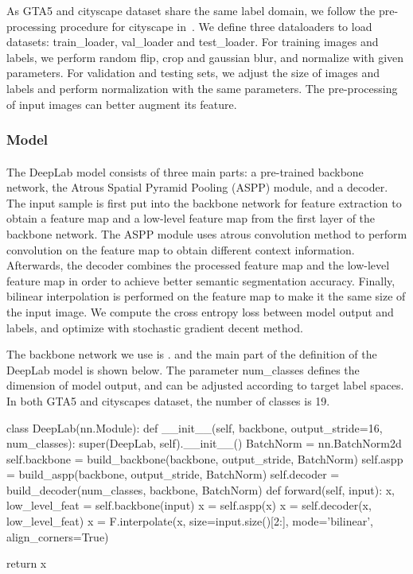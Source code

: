 As GTA5 and cityscape dataset share the same label domain, we follow the pre-processing procedure for cityscape in~\cite{Deeplab}. We define three dataloaders to load datasets: train\_loader, val\_loader and test\_loader. For training images and labels, we perform random flip, crop and gaussian blur, and normalize with given parameters. For validation and testing sets, we adjust the size of images and labels and perform normalization with the same parameters. The pre-processing of input images can better augment its feature.
\subsubsection{Model}
\paragraph{}
The DeepLab model consists of three main parts: a pre-trained backbone network, the Atrous Spatial Pyramid Pooling (ASPP) module, and a decoder. The input sample is first put into the backbone network for feature extraction to obtain a feature map and a low-level feature map from the first layer of the backbone network. The ASPP module uses atrous convolution method to perform convolution on the feature map to obtain different context information. Afterwards, the decoder combines the processed feature map and the low-level feature map in order to achieve better semantic segmentation accuracy. Finally, bilinear interpolation is performed on the feature map to make it the same size of the input image. We compute the cross entropy loss between model output and labels, and optimize with stochastic gradient decent method.

The backbone network we use is . and the main part of the definition of the  DeepLab model is shown below. The parameter num\_classes defines the dimension of model output, and can be adjusted according to target label spaces. In both GTA5 and cityscapes dataset, the number of classes is 19.
\begin{python}
class DeepLab(nn.Module):
    def __init__(self, backbone, output_stride=16, num_classes):
        super(DeepLab, self).__init__()
        BatchNorm = nn.BatchNorm2d
        self.backbone = build_backbone(backbone, output_stride, BatchNorm)
        self.aspp = build_aspp(backbone, output_stride, BatchNorm)
        self.decoder = build_decoder(num_classes, backbone, BatchNorm)
    def forward(self, input):
        x, low_level_feat = self.backbone(input)
        x = self.aspp(x)
        x = self.decoder(x, low_level_feat)
        x = F.interpolate(x, size=input.size()[2:], mode='bilinear', align_corners=True)

        return x
\end{python}
